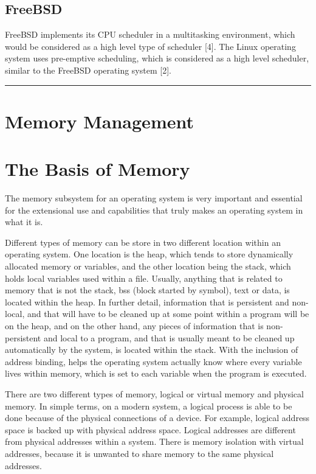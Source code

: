\documentclass[letterpaper,10pt,onecolumn]{IEEEtran}
\begin{document}
	\subsection*{FreeBSD}
	FreeBSD implements its CPU scheduler in a multitasking environment, which would be considered as a high level type of scheduler [4]. The Linux operating system uses pre-emptive scheduling, which is considered as a high level scheduler, similar to the FreeBSD operating system [2].

\noindent\rule{17.8cm}{0.4pt}
\section{\textbf{Memory Management}}

\section*{The Basis of Memory}
\par
The memory subsystem for an operating system is very important and essential for the extensional use and capabilities that truly makes an operating system in what it is. 
\par
Different types of memory can be store in two different location within an operating system. One location is the heap, which tends to store dynamically allocated memory or variables, and the other location being the stack, which holds local variables used within a file. Usually, anything that is related to memory that is not the stack, bss (block started by symbol), text or data, is located within the heap. In further detail, information that is persistent and non-local, and that will have to be cleaned up at some point within a program will be on the heap, and on the other hand, any pieces of information that is non-persistent and local to a program, and that is usually meant to be cleaned up automatically by the system, is located within the stack. With the inclusion of address binding, helps the operating system actually know where every variable lives within memory, which is set to each variable when the program is executed.
\par
There are two different types of memory, logical or virtual memory and physical memory. In simple terms, on a modern system, a logical process is able to be done because of the physical connections of a device. For example, logical address space is backed up with physical address space. Logical addresses are different from physical addresses within a system. There is memory isolation with virtual addresses, because it is unwanted to share memory to the same physical addresses.
\end{document}
